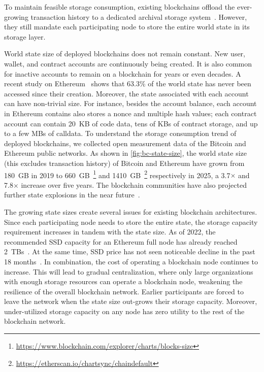 To maintain feasible storage consumption, existing blockchains offload the ever-growing transaction history to a dedicated archival storage system~\cite{ruan2019fine,feng2024slimarchive}.
However, they still mandate each participating node to store the entire world state in its storage layer.

World state size of deployed blockchains does not remain constant.
New user, wallet, and contract accounts are continuously being created.
It is also common for inactive accounts to remain on a blockchain for years or even decades.
A recent study on Ethereum~\cite{notallstate2025} shows that 63.3\% of the world state has never been accessed since their creation.
Moreover, the state associated with each account can have non-trivial size.
For instance, besides the account balance, each account in Ethereum contains also stores a nonce and multiple hash values;
each contract account can contain 20~KB of code data, tens of KBs of contract storage, and up to a few MBs of calldata.
To understand the storage consumption trend of deployed blockchains, we collected open measurement data of the Bitcoin and Ethereum public networks.
As shown in \autoref{fig:bc-state-size}, the world state size (this excludes transaction history) of Bitcoin and Ethereum have grown from 180~GB in 2019 to 660~GB~\footnote{\url{https://www.blockchain.com/explorer/charts/blocks-size}} and 1410~GB~\footnote{\url{https://etherscan.io/chartsync/chaindefault}} respectively in 2025, a 3.7$\times$ and 7.8$\times$ increase over five years.
The blockchain communities have also projected further state explosions in the near future~\cite{eth-state, state-bloat}.

The growing state sizes create several issues for existing blockchain architectures.
Since each participating node needs to store the entire state, the storage capacity requirement increases in tandem with the state size.
As of 2022, the recommended SSD capacity for an Ethereum full node has already reached 2~TBs~\cite{eth-requirement}.
At the same time, SSD price has not seen noticeable decline in the past 18 months~\cite{ssd-price}.
In combination, the cost of operating a blockchain node continues to increase.
This will lead to gradual centralization, where only large organizations with enough storage resources can operate a blockchain node, weakening the resilience of the overall blockchain network.
Earlier participants are forced to leave the network when the state size out-grows their storage capacity.
Moreover, under-utilized storage capacity on any node has zero utility to the rest of the blockchain network.

